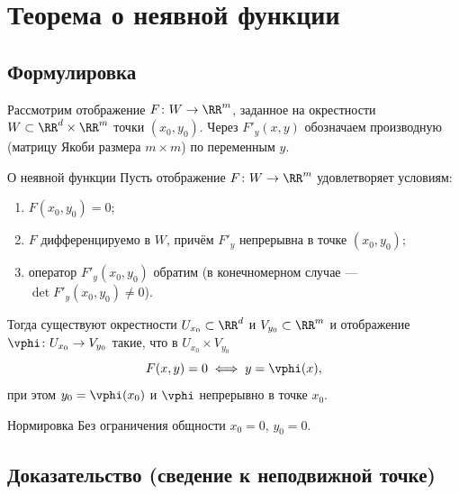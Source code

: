 
\section{Теорема о неявной функции}

\subsection*{Формулировка}

Рассмотрим отображение $F\colon W\to\RR^m$, заданное на окрестности
$W\subset\RR^d\times\RR^m$ точки $(x_0,y_0)$. Через $F'_y(x,y)$ обозначаем
производную (матрицу Якоби размера $m\times m$) по переменным $y$.

\begin{Theorem}{О неявной функции}{}
	Пусть отображение $F\colon W\to\RR^m$ удовлетворяет условиям:
	\begin{enumerate}
		\item $F(x_0,y_0)=0$;
		\item $F$ дифференцируемо в $W$, причём $F'_y$ непрерывна в точке $(x_0,y_0)$;
		\item оператор $F'_y(x_0,y_0)$ обратим (в конечномерном случае ---
		$\det F'_y(x_0,y_0)\ne 0$).
	\end{enumerate}
	Тогда существуют окрестности $U_{x_0}\subset\RR^d$ и $V_{y_0}\subset\RR^m$ и
	отображение $\vphi\colon U_{x_0}\to V_{y_0}$ такие, что в $U_{x_0}\times V_{y_0}$
	\[
	F(x,y)=0\iff y=\vphi(x),
	\]
	при этом $y_0=\vphi(x_0)$ и $\vphi$ непрерывно в точке $x_0$.
\end{Theorem}

\begin{Remark}{Нормировка}{}
	Без ограничения общности $x_0=0$, $y_0=0$.
\end{Remark}

\subsection*{Доказательство (сведение к неподвижной точке)}


